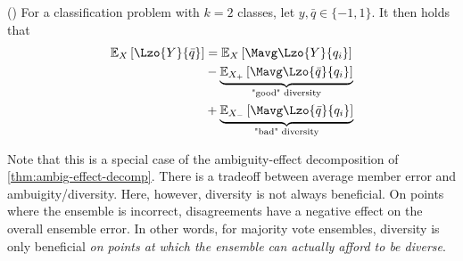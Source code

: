 \documentclass[../main.tex]{subfiles}
\begin{document}
\begin{corollary} (\cite{brown_GoodBadDiversity_2010})
    \label{thm:good-bad-diversity}
For a classification problem with $k=2$ classes, let $y, \bar{q} \in \{ -1, 1 \}$. It then holds that
\begin{align*}
\mathbb{E}_{X}\left[   \Lzo{Y}{\bar{q}} \right] 
&= 
\mathbb{E}_{X}\left[    \Mavg \Lzo{Y}{q_{i}}  \right] \\
&- 
\underbrace{
\mathbb{E}_{X_{+}}\left[ \Mavg \Lzo{\bar{q}}{q_{i}} \right]  
}_{\text{"good" diversity}} \\
&+ 
\underbrace{
\mathbb{E}_{X_{-}}\left[ \Mavg \Lzo{\bar{q}}{q_{i}} \right] 
}_{\text{"bad" diversity}}
\end{align*}
\end{corollary}


Note that this is a special case of the ambiguity-effect decomposition of \cref{thm:ambig-effect-decomp}.
There is a tradeoff between average member error and ambuigity/diversity. Here, however, diversity is not always beneficial. On points where the ensemble is incorrect, disagreements have a negative effect on the overall ensemble error.
In other words, for majority vote ensembles, diversity is only beneficial \textit{on points at which the ensemble can actually afford to be diverse}. 
\end{document}
